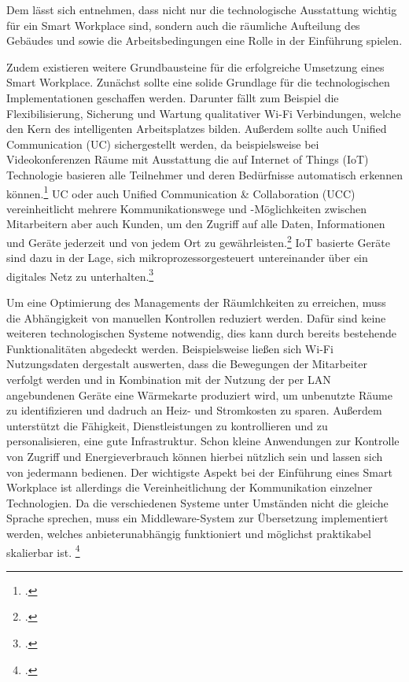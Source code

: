 Dem lässt sich entnehmen, dass nicht nur die technologische Ausstattung wichtig für ein Smart Workplace sind, sondern auch die räumliche Aufteilung des Gebäudes und sowie die Arbeitsbedingungen eine Rolle in der Einführung spielen.

Zudem existieren weitere Grundbausteine für die erfolgreiche Umsetzung eines Smart Workplace. Zunächst sollte eine solide Grundlage für die technologischen Implementationen geschaffen werden. Darunter fällt zum Beispiel die Flexibilisierung, Sicherung und Wartung qualitativer Wi-Fi Verbindungen, welche den Kern des intelligenten Arbeitsplatzes bilden. Außerdem sollte auch Unified Communication (UC) sichergestellt werden, da beispielsweise bei Videokonferenzen Räume mit Ausstattung die auf Internet of Things (IoT) Technologie basieren alle Teilnehmer und deren Bedürfnisse automatisch erkennen können.\footcite[Vgl.][]{SCmagazineUK} UC oder auch Unified Communication \& Collaboration (UCC) vereinheitlicht mehrere Kommunikationswege und -Möglichkeiten zwischen Mitarbeitern aber auch Kunden, um den Zugriff auf alle Daten, Informationen und Geräte jederzeit und von jedem Ort zu gewährleisten.\footcite[Vgl.][]{CompWoche} IoT basierte Geräte sind dazu in der Lage, sich mikroprozessorgesteuert untereinander über ein digitales Netz zu unterhalten.\footcite[Vgl.][]{mittelstand}

Um eine Optimierung des Managements der Räumlchkeiten zu erreichen, muss die Abhängigkeit von manuellen Kontrollen reduziert werden. Dafür sind keine weiteren technologischen Systeme notwendig, dies kann durch bereits bestehende Funktionalitäten abgedeckt werden. Beispielsweise ließen sich Wi-Fi Nutzungsdaten dergestalt auswerten, dass die Bewegungen der Mitarbeiter verfolgt werden und in Kombination mit der Nutzung der per LAN angebundenen Geräte eine Wärmekarte produziert wird, um unbenutzte Räume zu identifizieren und dadruch an Heiz- und Stromkosten zu sparen. Außerdem unterstützt die Fähigkeit, Dienstleistungen zu kontrollieren und zu personalisieren, eine gute Infrastruktur. Schon kleine Anwendungen zur Kontrolle von Zugriff und Energieverbrauch können hierbei nützlich sein und lassen sich von jedermann bedienen. Der wichtigste Aspekt bei der Einführung eines Smart Workplace ist allerdings die Vereinheitlichung der Kommunikation einzelner Technologien. Da die verschiedenen Systeme unter Umständen nicht die gleiche Sprache sprechen, muss ein Middleware-System zur Übersetzung implementiert werden, welches anbieterunabhängig funktioniert und möglichst praktikabel skalierbar ist.
\footcite[Vgl.][]{SCmagazineUK}
